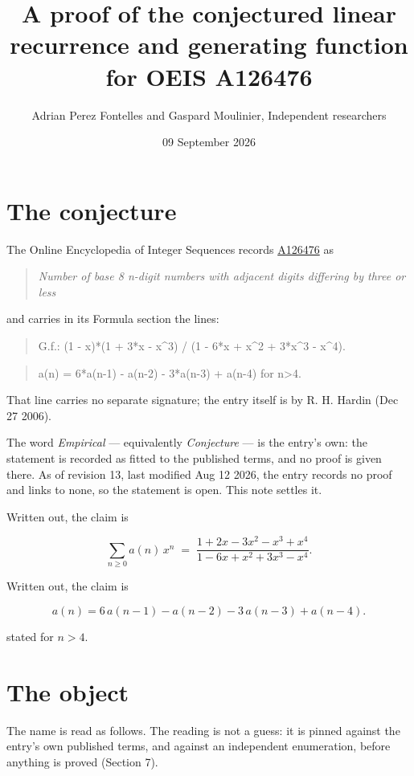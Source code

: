 \documentclass[11pt]{article}
\title{A proof of the conjectured linear recurrence and generating function for OEIS A126476}
\author{Adrian Perez Fontelles and Gaspard Moulinier, Independent researchers}
\date{09 September 2026}
\theoremstyle{definition}
\begin{document}
\maketitle
\section{The conjecture}

The Online Encyclopedia of Integer Sequences records \href{https://oeis.org/A126476}{A126476} as

\begin{quote}\itshape Number of base 8 n-digit numbers with adjacent digits differing by three or less\end{quote}

and carries in its Formula section the lines:

\begin{quote}\ttfamily G.f.: (1 - x)*(1 + 3*x - x\textasciicircum{}3) / (1 - 6*x + x\textasciicircum{}2 + 3*x\textasciicircum{}3 - x\textasciicircum{}4).\end{quote}

\begin{quote}\ttfamily a(n) = 6*a(n-1) - a(n-2) - 3*a(n-3) + a(n-4) for n>4.\end{quote}

That line carries no separate signature; the entry itself is by R. H. Hardin (Dec 27 2006).

The word {\itshape Empirical} --- equivalently {\itshape Conjecture} --- is the entry's own: the statement is recorded as fitted to the published terms, and no proof is given there. As of revision 13, last modified Aug 12 2026, the entry records no proof and links to none, so the statement is open. This note settles it.

Written out, the claim is

\[\sum_{n \ge 0} a(n)\,x^n \;=\; \frac{1 + 2x - 3x^{2} - x^{3} + x^{4}}{1 - 6x + x^{2} + 3x^{3} - x^{4}}.\]

Written out, the claim is

\[a(n) = 6\,a(n-1) - a(n-2) - 3\,a(n-3) + a(n-4).\]

stated for $n > 4$.

\section{The object}

The name is read as follows. The reading is not a guess: it is pinned against the entry's own published terms, and against an independent enumeration, before anything is proved (Section 7).
\end{document}
